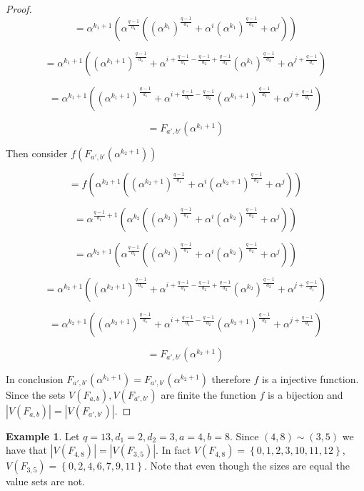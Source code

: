 \documentclass{article}
\theoremstyle{definition}
\newtheorem{example}[theorem]{Example}
\theoremstyle{remark}
\numberwithin{equation}{section}
\begin{document}
\begin{proof}
  $$= \alpha^{k_1+1}(\alpha^{\frac{q-1}{d_1}}((\alpha^{k_1})^{\frac{q-1}{d_1}} + \alpha^{i}(\alpha^{k_1})^{\frac{q-1}{d_2}} + \alpha^{j}))$$ 

  $$= \alpha^{k_1+1}((\alpha^{k_1+1})^{\frac{q-1}{d_1}} + \alpha^{i + \frac{q-1}{d_1} - \frac{q-1}{d_2} + \frac{q-1}{d_2}}(\alpha^{k_1})^{\frac{q-1}{d_2}} + \alpha^{j + \frac{q-1}{d_1}})$$

  $$= \alpha^{k_1+1}((\alpha^{k_1+1})^{\frac{q-1}{d_1}} + \alpha^{i + \frac{q-1}{d_1} - \frac{q-1}{d_2}}(\alpha^{k_1+1})^{\frac{q-1}{d_2}} + \alpha^{j + \frac{q-1}{d_1}})$$ 

  $$= F_{a', b'}(\alpha^{k_1+1})$$

  Then consider $f(F_{a', b'}(\alpha^{k_2+1}))$

  $$= f(\alpha^{k_2+1}((\alpha^{k_2+1})^{\frac{q-1}{d_1}} + \alpha^{i}(\alpha^{k_2+1})^{\frac{q-1}{d_2}} + \alpha^{j}))$$

  $$ = \alpha^{\frac{q-1}{d_1}+1}(\alpha^{k_2}((\alpha^{k_2})^{\frac{q-1}{d_1}} + \alpha^{i}(\alpha^{k_2})^{\frac{q-1}{d_2}} + \alpha^{j}))$$

  $$ = \alpha^{k_2+1}(\alpha^{\frac{q-1}{d_1}}((\alpha^{k_2})^{\frac{q-1}{d_1}} + \alpha^{i}(\alpha^{k_2})^{\frac{q-1}{d_2}} + \alpha^{j}))$$

  $$ = \alpha^{k_2+1}((\alpha^{k_2 + 1})^{\frac{q-1}{d_1}} + \alpha^{i + \frac{q-1}{d_1} - \frac{q-1}{d_2} + \frac{q-1}{d_2}}(\alpha^{k_2})^{\frac{q-1}{d_2}} + \alpha^{j + \frac{q-1}{d_1}})$$

  $$= \alpha^{k_2+1}((\alpha^{k_2 + 1})^{\frac{q-1}{d_1}} + \alpha^{i + \frac{q-1}{d_1} - \frac{q-1}{d_2}}(\alpha^{k_2 + 1})^{\frac{q-1}{d_2}} + \alpha^{j + \frac{q-1}{d_1}})$$

  $$= F_{a', b'}(\alpha^{k_2+1})$$

  In conclusion $F_{a', b'}(\alpha^{k_1+1}) = F_{a', b'}(\alpha^{k_2+1})$ therefore $f$ is a injective function. Since the sets $V(F_{a,b}), V(F_{a',b'})$ are finite the function $f$ is a bijection and $|V(F_{a,b})| = |V(F_{a',b'})|$.

\end{proof}

 \begin{example}
    Let $q = 13, d_1 = 2, d_2 = 3, a = 4, b = 8$. Since $(4,8) \sim (3,5)$ we have that $|V(F_{4, 8})| = |V(F_{3, 5})|$. In fact $V(F_{4, 8}) = \left\{0, 1, 2, 3, 10, 11, 12\right\}$, $V(F_{3, 5}) = \left\{0, 2, 4, 6, 7, 9, 11\right\}$. Note that even though the sizes are equal the value sets are not.
  \end{example}
\end{document}

